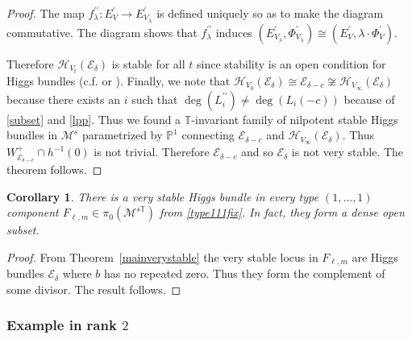 \documentclass[12pt]{article}
\numberwithin{equation}{section}
\newtheorem{corollary}[theorem]{Corollary}
\theoremstyle{remark}
\theoremstyle{definition}
\numberwithin{theorem}{section}
\def\bP{{\mathbb P}}
\def\calE{{\mathcal E}}
\def\M{{\mathcal{M}}}
\def\calH{\mathcal{H}}
\newcommand{\T}{{\mathbb{T}}}
\def\d{{{\delta}}}
\def\mm{{{\ell,m}}}
\renewcommand{\1}{\mathbbm{1}}
\begin{document}
\begin{proof}
	The map $f_\lambda^{\prime\prime}:E_V^\prime\to E^\prime_{V_\lambda}$ is defined uniquely so as to make the diagram commutative.  The diagram shows that $f_\lambda^{\prime\prime}$ induces $(E^\prime_{V_\lambda},\Phi^\prime_{V_\lambda})\cong (E^\prime_V,\lambda\cdot \Phi^\prime_V)$. 
	
	Therefore   $\calH_{ V_t}(\calE_{\d})$ is stable for all $t$ since stability is an open condition for Higgs bundles (c.f. \cite[Lemma 3.7]{simpson1} or \cite[Proposition 3.1]{nitsure}). Finally, we note that $  \calH_{ V_0}(\calE_{\d})\cong \calE_{\d-c} \not\cong \calH_{ V_\infty}(\calE_{\d})$ because there exists an $i$ such that $\deg(L_i^{\prime\prime})\neq \deg(L_i(-c))$ because of \eqref{subset} and \eqref{lpp}. Thus we found a $\T$-invariant family of nilpotent stable Higgs bundles in $\M^s$ parametrized by $\bP^1$ connecting  $\calE_{\d-c}$ and $\calH_{ V_\infty}(\calE_{\d})$. Thus $W^+_{\calE_{\d-c}}\cap h^{-1}(0)$ is not trivial. Therefore $\calE_{\d-c}$ and so $\calE_{\d}$ is not very stable. The  theorem follows. 
	
\end{proof}

\begin{corollary} \label{type111} There is a very stable Higgs bundle in every type $(1,\dots,1)$ component $F_{\mm}\in \pi_0(\M^{s\T})$ from \eqref{type111fix}. In fact, they form a dense open subset. 
\end{corollary}

\begin{proof} From Theorem~\ref{mainverystable} the very stable locus in $F_{\mm}$ are Higgs bundles $\calE_{\d}$ where $b$ has no repeated zero. Thus they form the complement of some divisor. The result follows. 
\end{proof}

\subsubsection{Example in rank $2$}
\end{document}
